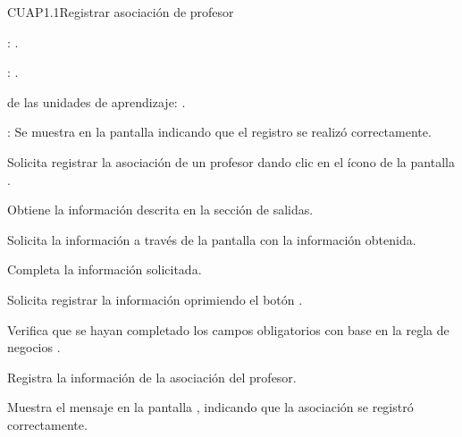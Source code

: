 \begin{UseCase}{CUAP1.1}{Registrar asociación de profesor}
{\begin{UClist}
			\UCli {}: \ioObtener.
			
			\UCli {}: \ioObtener.
			
			\UCli {} de las unidades de aprendizaje: \ioObtener.
			
			\UCli {}: Se muestra en la pantalla  indicando que el registro se realizó correctamente.
		\end{UClist}
	}
\end{UseCase}

\begin{UCtrayectoria}
	\UCpaso [\UCactor] Solicita registrar la asociación de un profesor dando clic en el ícono \btnRegistrar de la pantalla . 
	
	\UCpaso [\UCsist] Obtiene la información descrita en la sección de salidas.
	
	\UCpaso [\UCsist] Solicita la información a través de la pantalla  con la información obtenida.
	
	\UCpaso [\UCactor] Completa la información solicitada. \label{CUAP1.1:CompletaInfo}
	
	\UCpaso [\UCactor] Solicita registrar la información oprimiendo el botón . 
	
	\UCpaso [\UCsist] Verifica que se hayan completado los campos obligatorios con base en la regla de negocios . 
	
	\UCpaso [\UCsist] Registra la información de la asociación del profesor.
	
	\UCpaso [\UCsist] Muestra el mensaje  en la pantalla , indicando que la asociación  se registró correctamente.	
	
\end{UCtrayectoria}


